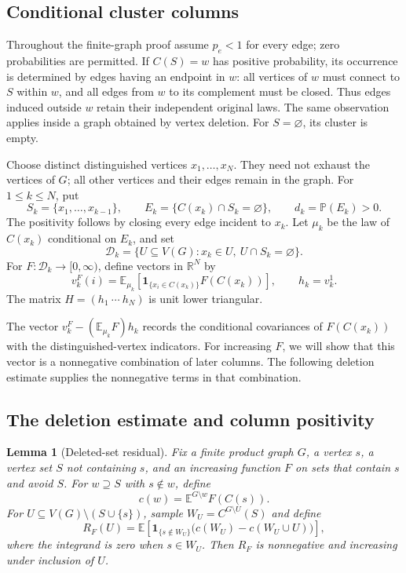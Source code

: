 \documentclass[11pt]{article}
\newtheorem{lemma}[theorem]{Lemma}
\theoremstyle{definition}
\begin{document}
\subsection{Conditional cluster columns}

Throughout the finite-graph proof assume $p_e<1$ for every edge; zero
probabilities are permitted.  If $C(S)=w$ has positive probability, its
occurrence is determined by edges having an endpoint in $w$: all vertices
of $w$ must connect to $S$ within $w$, and all edges from $w$ to its
complement must be closed.  Thus edges induced outside $w$ retain their
independent original laws.  The same observation applies inside a graph
obtained by vertex deletion.  For $S=\varnothing$, its cluster is empty.

Choose distinct distinguished vertices $x_1,\ldots,x_N$.
They need not exhaust the vertices of $G$; all other vertices and their
edges remain in the graph.  For $1\le k\le N$, put
\[
 S_k=\{x_1,\ldots,x_{k-1}\},\qquad
 E_k=\{C(x_k)\cap S_k=\varnothing\},\qquad d_k=\mathbb P(E_k)>0.
\]
The positivity follows by closing every edge incident to $x_k$.
Let $\mu_k$ be the law of $C(x_k)$ conditional on $E_k$, and set
\[
 \mathcal D_k=\{U\subseteq V(G):x_k\in U,\ U\cap S_k=\varnothing\}.
\]
For $F:\mathcal D_k\to[0,\infty)$, define vectors in $\mathbb R^N$ by
\[
 v_k^F(i)=\mathbb E_{\mu_k}
              [\mathbf1_{\{x_i\in C(x_k)\}}F(C(x_k))],
 \qquad h_k=v_k^1.
\]
The matrix $H=(h_1\ \cdots\ h_N)$ is unit lower triangular.

The vector $v_k^F-(\mathbb E_{\mu_k}F)h_k$ records the conditional
covariances of $F(C(x_k))$ with the distinguished-vertex indicators.
For increasing $F$, we will show that this vector is a nonnegative
combination of later columns.
The following deletion estimate supplies the nonnegative terms in that
combination.

\subsection{The deletion estimate and column positivity}

\begin{lemma}[Deleted-set residual]
\label{lem:deleted-residual}
Fix a finite product graph $G$, a vertex $s$, a vertex set $S$ not
containing $s$, and an increasing function $F$ on sets that contain $s$
and avoid $S$.  For $w\supseteq S$ with $s\notin w$, define
\[
 c(w)=\mathbb E^{G\setminus w}F(C(s)).
\]
For $U\subseteq V(G)\setminus(S\cup\{s\})$, sample
$W_U=C^{G\setminus U}(S)$ and define
\[
 R_F(U)=\mathbb E\left[
  \mathbf1_{\{s\notin W_U\}}
       \bigl(c(W_U)-c(W_U\cup U)\bigr)\right],
\]
where the integrand is zero when $s\in W_U$.  Then $R_F$ is nonnegative
and increasing under inclusion of $U$.
\end{lemma}
\end{document}
